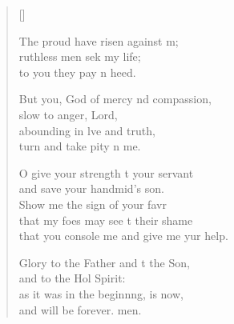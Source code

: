 \begin{verse}[\versewidth]
\begin{patverse}
The proud have risen against m;\Flex\\
ruthless men sek my life;\Med\\
to you they pay n heed.

But you, God of mercy nd compassion,\Med\\
slow to anger,  Lord,\\
abounding in lve and truth,\Med\\
turn and take pity n me.

O give your strength t your servant\Med\\
and save your handmid’s son.\\
Show me the sign of your favr\Flex\\
that my foes may see t their shame\Med\\
that you console me and give me yur help.

Glory to the Father and t the Son,\Med\\
and to the Hol Spirit:\\
as it was in the beginnng, is now,\Med\\
and will be forever. men.
  \end{patverse}
\end{verse}
